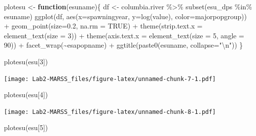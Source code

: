 \documentclass[
]{article}
\newenvironment{Shaded}{\begin{snugshade}}{\end{snugshade}}
\newcommand{\AttributeTok}[1]{\textcolor[rgb]{0.77,0.63,0.00}{#1}}
\newcommand{\ConstantTok}[1]{\textcolor[rgb]{0.00,0.00,0.00}{#1}}
\newcommand{\ControlFlowTok}[1]{\textcolor[rgb]{0.13,0.29,0.53}{\textbf{#1}}}
\newcommand{\DecValTok}[1]{\textcolor[rgb]{0.00,0.00,0.81}{#1}}
\newcommand{\FloatTok}[1]{\textcolor[rgb]{0.00,0.00,0.81}{#1}}
\newcommand{\FunctionTok}[1]{\textcolor[rgb]{0.00,0.00,0.00}{#1}}
\newcommand{\NormalTok}[1]{#1}
\newcommand{\OtherTok}[1]{\textcolor[rgb]{0.56,0.35,0.01}{#1}}
\newcommand{\SpecialCharTok}[1]{\textcolor[rgb]{0.00,0.00,0.00}{#1}}
\newcommand{\StringTok}[1]{\textcolor[rgb]{0.31,0.60,0.02}{#1}}
\begin{document}
\begin{Shaded}
\begin{Highlighting}[]
\NormalTok{plotesu }\OtherTok{\textless{}{-}} \ControlFlowTok{function}\NormalTok{(esuname)\{}
\NormalTok{  df }\OtherTok{\textless{}{-}}\NormalTok{ columbia.river }\SpecialCharTok{\%\textgreater{}\%} \FunctionTok{subset}\NormalTok{(esu\_dps }\SpecialCharTok{\%in\%}\NormalTok{ esuname)}
\FunctionTok{ggplot}\NormalTok{(df, }\FunctionTok{aes}\NormalTok{(}\AttributeTok{x=}\NormalTok{spawningyear, }\AttributeTok{y=}\FunctionTok{log}\NormalTok{(value), }\AttributeTok{color=}\NormalTok{majorpopgroup)) }\SpecialCharTok{+} 
  \FunctionTok{geom\_point}\NormalTok{(}\AttributeTok{size=}\FloatTok{0.2}\NormalTok{, }\AttributeTok{na.rm =} \ConstantTok{TRUE}\NormalTok{) }\SpecialCharTok{+} 
  \FunctionTok{theme}\NormalTok{(}\AttributeTok{strip.text.x =} \FunctionTok{element\_text}\NormalTok{(}\AttributeTok{size =} \DecValTok{3}\NormalTok{)) }\SpecialCharTok{+}
  \FunctionTok{theme}\NormalTok{(}\AttributeTok{axis.text.x =} \FunctionTok{element\_text}\NormalTok{(}\AttributeTok{size =} \DecValTok{5}\NormalTok{, }\AttributeTok{angle =} \DecValTok{90}\NormalTok{)) }\SpecialCharTok{+}
  \FunctionTok{facet\_wrap}\NormalTok{(}\SpecialCharTok{\textasciitilde{}}\NormalTok{esapopname) }\SpecialCharTok{+}
  \FunctionTok{ggtitle}\NormalTok{(}\FunctionTok{paste0}\NormalTok{(esuname, }\AttributeTok{collapse=}\StringTok{"}\SpecialCharTok{\textbackslash{}n}\StringTok{"}\NormalTok{))}
\NormalTok{\}}
\end{Highlighting}
\end{Shaded}

\begin{Shaded}
\begin{Highlighting}[]
\FunctionTok{plotesu}\NormalTok{(esu[}\DecValTok{3}\NormalTok{])}
\end{Highlighting}
\end{Shaded}

\texttt{[image: Lab2-MARSS\_files/figure-latex/unnamed-chunk-7-1.pdf]}

\begin{Shaded}
\begin{Highlighting}[]
\FunctionTok{plotesu}\NormalTok{(esu[}\DecValTok{4}\NormalTok{])}
\end{Highlighting}
\end{Shaded}

\texttt{[image: Lab2-MARSS\_files/figure-latex/unnamed-chunk-8-1.pdf]}

\begin{Shaded}
\begin{Highlighting}[]
\FunctionTok{plotesu}\NormalTok{(esu[}\DecValTok{5}\NormalTok{])}
\end{Highlighting}
\end{Shaded}
\end{document}
